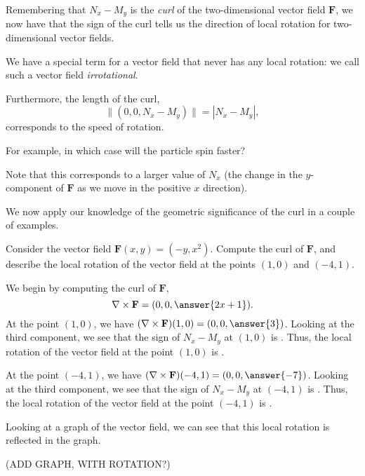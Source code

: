 \documentclass{ximera}
\begin{document}
Remembering that $N_x-M_y$ is the \emph{curl} of the two-dimensional vector field $\mathbf{F}$, we now have that the sign of the curl tells us the direction of local rotation for two-dimensional vector fields.

We have a special term for a vector field that never has any local rotation: we call such a vector field \emph{irrotational}.

Furthermore, the length of the curl,
\[
\|(0,0,N_x-M_y)\|=|N_x-M_y|,
\]
corresponds to the speed of rotation.

For example, in which case will the particle spin faster? 

\begin{multipleChoice}
\end{multipleChoice}

Note that this corresponds to a larger value of $N_x$ (the change in the $y$-component of $\mathbf{F}$ as we move in the positive $x$ direction).

We now apply our knowledge of the geometric significance of the curl in a couple of examples.

\begin{example}
Consider the vector field $\mathbf{F}(x,y)=(-y,x^2)$. Compute the curl of $\mathbf{F}$, and describe the local rotation of the vector field at the points $(1,0)$ and $(-4,1)$.
\begin{explanation}
We begin by computing the curl of $\mathbf{F}$,
\[
\nabla\times\mathbf{F} = (0,0,\answer{2x+1}).
\]
At the point $(1,0)$, we have $(\nabla\times\mathbf{F})(1,0) = (0,0,\answer{3})$. Looking at the third component, we see that the sign of $N_x-M_y$ at $(1,0)$ is . Thus, the local rotation of the vector field at the point $(1,0)$ is .

At the point $(-4,1)$, we have $(\nabla\times\mathbf{F})(-4,1) = (0,0,\answer{-7})$. Looking at the third component, we see that the sign of $N_x-M_y$ at $(-4,1)$ is . Thus, the local rotation of the vector field at the point $(-4,1)$ is .

Looking at a graph of the vector field, we can see that this local rotation is reflected in the graph.

(ADD GRAPH, WITH ROTATION?)
\end{explanation}
\end{example}
\end{document}
